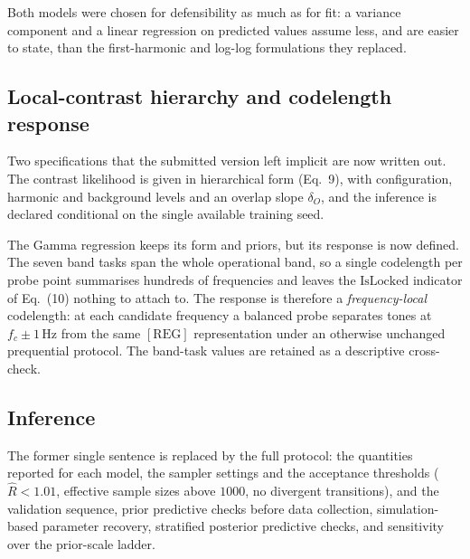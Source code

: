 \documentclass[
	letterpaper, %
	10pt, %
	unnumberedsections, %
	twoside, %
]{LTJournalArticle}
\begin{document}
Both models were chosen for defensibility as much as for fit: a variance component and a linear
regression on predicted values assume less, and are easier to state, than the first-harmonic and
log-log formulations they replaced.

\subsection{Local-contrast hierarchy and codelength response}
Two specifications that the submitted version left implicit are now written out. The contrast
likelihood is given in hierarchical form (Eq.~9), with configuration, harmonic and background
levels and an overlap slope $\delta_O$, and the inference is declared conditional on the single
available training seed.

The Gamma regression keeps its form and priors, but its response is now defined. The seven band
tasks span the whole operational band, so a single codelength per probe point summarises hundreds
of frequencies and leaves the $\text{IsLocked}$ indicator of Eq.~(10) nothing to attach to. The
response is therefore a \emph{frequency-local} codelength: at each candidate frequency a balanced
probe separates tones at $f_c\pm1\,\mathrm{Hz}$ from the same $[\mathrm{REG}]$ representation under
an otherwise unchanged prequential protocol. The band-task values are retained as a descriptive
cross-check.

\subsection{Inference}
The former single sentence is replaced by the full protocol: the quantities reported for each
model, the sampler settings and the acceptance thresholds ($\hat R<1.01$, effective sample sizes
above $1000$, no divergent transitions), and the validation sequence, prior predictive checks
before data collection, simulation-based parameter recovery, stratified posterior predictive
checks, and sensitivity over the prior-scale ladder.
\end{document}
